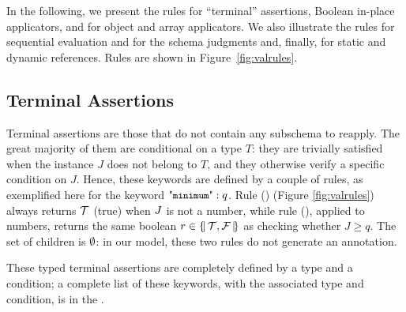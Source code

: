 In the following, we present the rules for ``terminal'' assertions, Boolean in-place applicators, and for object and
array applicators. We also illustrate the rules for sequential evaluation and for the schema judgments and, finally, for static and dynamic references.  
Rules are shown in Figure~\ref{fig:valrules}.





\subsection{Terminal Assertions}\label{sec:terminal}

Terminal assertions are those that do not contain any subschema to reapply.
The great majority of them are conditional on a type $T$: they are trivially satisfied when the instance $J$ does
not belong to $T$, and they otherwise verify a specific condition on $J$. 
Hence, these keywords are defined by a couple of rules,
as exemplified here for the keyword $\amin: q$.
Rule (\rmin\TTriv) (Figure \ref{fig:valrules}) always returns $\mathcal{T}$ (true) when ${J}$ is not a number, while rule (\rmin),
applied to numbers, returns the same boolean $r\in\{\!|\,{\mathcal{T},\mathcal{F}}\,|\!\}$ as checking whether $J \geq q$.
The set of {\evaluated} children is $\emptyset$: in our model, these two rules do not generate an annotation.

%


These typed terminal assertions are completely defined by a type and a condition;
a complete list of these keywords, with the associated type and condition, 
is in the {\FV}.

